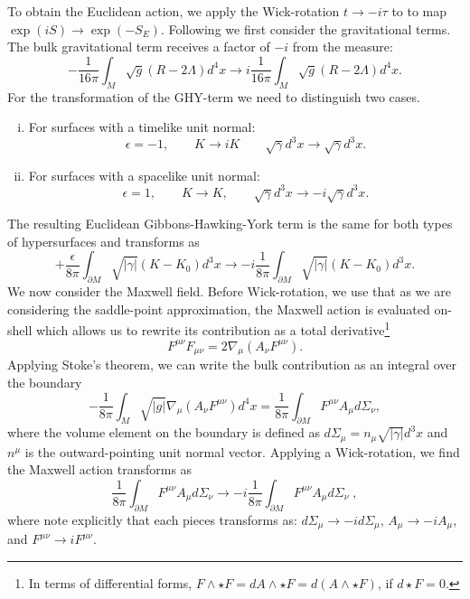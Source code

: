 To obtain the Euclidean action, we apply the Wick-rotation $t \rightarrow -i \tau$ to  to map
$\exp(i S) \rightarrow \exp(- S_E)$. Following \cite{York1986} we first consider the gravitational terms. The bulk gravitational term receives a factor of $-i$ from the measure:
\begin{equation*}
    -\frac{1}{16 \pi} \int_M \sqrt{g} (R - 2\Lambda) d^4 x 
 \rightarrow i \frac{1}{16 \pi} \int_M \sqrt{g} (R - 2\Lambda) d^4 x.
\end{equation*} 
For the transformation of the GHY-term we need to distinguish two cases.
\begin{enumerate}[(i)]
\item
For surfaces with a timelike unit normal: 
\begin{equation*}
\epsilon = -1, \qquad K \rightarrow i K \qquad \sqrt{\gamma} d^3x \rightarrow \sqrt{\gamma} d^3x	.
\end{equation*}
\item
For surfaces with a spacelike unit normal:
\begin{equation*}
\epsilon = 1, \qquad K \rightarrow K, \qquad \sqrt{\gamma} d^3x \rightarrow -i \sqrt{\gamma} d^3x.
\end{equation*}
\end{enumerate} 
The resulting Euclidean Gibbons-Hawking-York term is the same for both types of hypersurfaces and transforms as
\begin{equation*}
    + \frac{\epsilon}{8 \pi} \int_{\partial M} \sqrt{|\gamma|} (K - K_0) d^3x \rightarrow  -i \frac{1}{8 \pi} \int_{\partial M} \sqrt{|\gamma|} (K - K_0) d^3x .
\end{equation*}
We now consider the Maxwell field. Before Wick-rotation, we use that as we are considering the saddle-point approximation, the Maxwell action is evaluated on-shell which allows us to rewrite its contribution as a total derivative\footnote{In
terms of differential forms, $F\wedge \star F = dA \wedge \star F = d(A \wedge \star F)$, if
$d \star F=0$.}
\begin{equation*}
	F^{\mu \nu} F_{\mu \nu} = 2 \nabla_\mu (A_\nu F^{\mu \nu}).
\end{equation*}
Applying Stoke's theorem, we can write the bulk contribution as an integral over the boundary
\begin{equation*}
	- \frac{1}{8 \pi} \int_M \sqrt{|g|} \nabla_\mu \left( A_{\nu} F^{\mu \nu} \right) d^4 x = \frac{1}{8 \pi} \int_{\partial M} F^{\mu \nu} A_{\mu} d\Sigma_{\nu},
\end{equation*}
where the volume element on the boundary is defined as $d\Sigma_{\mu} = 
n_\mu \sqrt{|\gamma|} d^3x$ and $n^\mu$ is the outward-pointing unit normal vector. Applying a Wick-rotation, we find the Maxwell action transforms as
\begin{equation*}
     \frac{1}{8 \pi} \int_{\partial M} F^{\mu \nu} A_{\mu} d\Sigma_{\nu} \rightarrow  - i \frac{1}{8 \pi} \int_{\partial M} F^{\mu \nu} A_{\mu} d\Sigma_{\nu} \;,
\end{equation*}
where note explicitly that each pieces transforms as: $d\Sigma_{\mu} \rightarrow -id\Sigma_{\mu} $, $A_{\mu} \rightarrow -iA_{\mu}$, and $F^{\mu \nu} \rightarrow iF^{\mu \nu}$.

